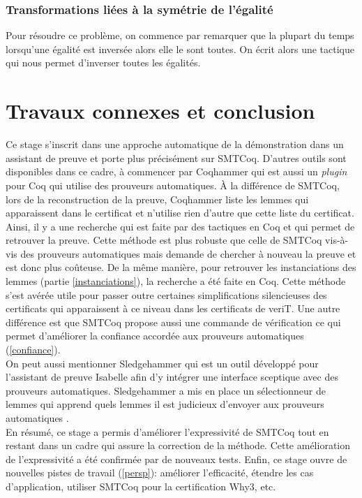 \documentclass[11pt]{article}
\begin{document}
\subsubsection{Transformations liées à la symétrie de l'égalité}

Pour résoudre ce problème, on commence par remarquer que la plupart du temps lorsqu'une égalité est inversée alors elle le sont toutes. On écrit alors une tactique qui nous permet d'inverser toutes les égalités. 


\section{Travaux connexes et conclusion}

Ce stage s'inscrit dans une approche automatique de la démonstration dans un assistant de preuve et porte plus précisément sur SMTCoq. D'autres outils sont disponibles dans ce cadre, à commencer par Coqhammer \cite{coqhammer} qui est aussi un \textit{plugin} pour Coq qui utilise des prouveurs automatiques. À la différence de SMTCoq, lors de la reconstruction de la preuve, Coqhammer liste les lemmes qui apparaissent dans le certificat et n'utilise rien d'autre que cette liste du certificat. Ainsi, il y a une recherche qui est faite par des tactiques en Coq et qui permet de retrouver la preuve. Cette méthode est plus robuste que celle  de SMTCoq vis-à-vis des prouveurs automatiques mais demande de chercher à nouveau la preuve et est donc plus coûteuse. De la même manière, pour retrouver les instanciations des lemmes (partie \ref{instanciations}), la recherche a été faite en Coq. Cette méthode s'est avérée utile pour passer outre certaines simplifications silencieuses des certificats qui apparaissent à ce niveau dans les certificats de veriT. Une autre différence est que SMTCoq propose aussi une commande de vérification ce qui permet d'améliorer la confiance accordée aux prouveurs automatiques (\ref{confiance}).\\
On peut aussi mentionner Sledgehammer \cite{sledgehammer_manual} qui est un outil développé pour l'assistant de preuve Isabelle afin d'y intégrer une interface sceptique avec des prouveurs automatiques. Sledgehammer a mis en place un sélectionneur de lemmes qui apprend quels lemmes il est judicieux d'envoyer aux prouveurs automatiques \cite{hol_selector}.\\

En résumé, ce stage a permis d'améliorer l'expressivité de SMTCoq tout en restant dans un cadre qui assure la correction de la méthode. Cette amélioration de l'expressivité a été confirmée par de nouveaux tests. Enfin, ce stage ouvre de nouvelles pistes de travail (\ref{persp}): améliorer l'efficacité, étendre les cas d'application, utiliser SMTCoq pour la certification Why3, etc.
\end{document}
